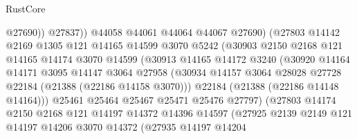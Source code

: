 \begin{lexlean}{RustCore}
\begin{coremodule}
                                  @27690))
                              @27837))
                          @44058
                          @44061
                          @44064
                          @44067
                          @27690)
                        (@27803
                          @14142
                          @2169
                          @1305
                          @121
                          @14165
                          @14599
                          @3070
                          @5242
                          (@30903
                            @2150
                            @2168
                            @121
                            @14165
                            @14174
                            @3070
                            @14599
                            (@30913
                              @14165
                              @14172
                              @3240
                              (@30920
                                @14164
                                @14171
                                @3095
                                @14147
                                @3064
                                @27958
                                (@30934
                                  @14157
                                  @3064
                                  @28028
                                  @27728
                                  @22184
                                  (@21388 (@22186 @14158 @3070)))
                                @22184
                                (@21388 (@22186 @14148 @14164)))
                              @25461
                              @25464
                              @25467
                              @25471
                              @25476
                              @27797)
                            (@27803
                              @14174
                              @2150
                              @2168
                              @121
                              @14197
                              @14372
                              @14396
                              @14597
                              (@27925
                                @2139
                                @2149
                                @121
                                @14197
                                @14206
                                @3070
                                @14372
                                (@27935
                                  @14197
                                  @14204

\end{coremodule}
\end{lexlean}
